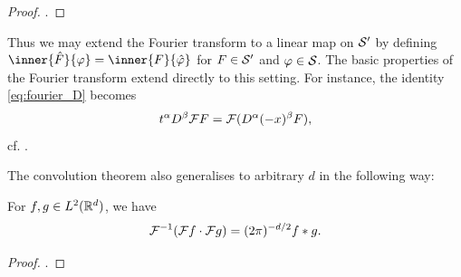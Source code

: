 \documentclass[article, a4paper, 11pt, oneside]{memoir}
\makeatletter
\let\phi\varphi
\numberwithin{equation}{chapter}
\newcommand{\fxnote}[1]{}
\theoremstyle{myexample}
\theoremstyle{myexample}
\theoremstyle{myexamplebreak}
\theoremstyle{myexamplebreak}
\theoremstyle{nonumberplain}
\newtheorem{proof}{\protect\@proof}
\theoremstyle{MyNonumberplain}
\newcommand{\@proof}{}
\renewcommand{\@proof}{Proof}%
\renewcommand{\@proof}{Bevis}%
\makeatother
\begin{document}
\begin{proof}
    \textcite[Corollary~8.28]{folland2007}.
\end{proof}
%
Thus we may extend the Fourier transform to a linear map on $\mathcal{S}'$ by defining $\inner{\hat F}{\phi} = \inner{F}{\hat \phi}$ for $F \in \mathcal{S}'$ and $\phi \in \schwartz$. The basic properties of the Fourier transform extend directly to this setting. For instance, the identity \eqref{eq:fourier_D} becomes
%
\begin{equation}
    \label{eq:fourier_D_distributions}
    t^\alpha D^\beta \mathcal{F} F = \mathcal{F}( D^\alpha (-x)^\beta F),
\end{equation}
%
cf. \textcite[p.~295]{folland2007}.

The convolution theorem also generalises to arbitrary $d$ in the following way:

\begin{proposition}
    \label{thm:convolution}
    For $f, g \in L^2(\mathbb{R}^d)$, we have
    \begin{equation*}
        \mathcal{F}^{-1} ( \mathcal{F} f \cdot \mathcal{F} g)
            = (2\pi)^{-d/2} f * g.
    \end{equation*}
\end{proposition}

\begin{proof}
    \textcite[Theorem~5.8]{liebloss2001}.
\end{proof}









\end{document}
